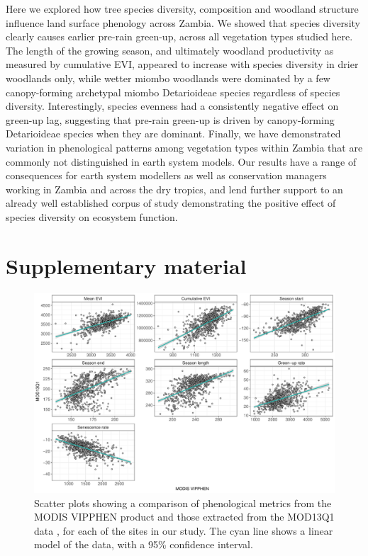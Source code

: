 \begin{refsection}
Here we explored how tree species diversity, composition and woodland structure influence land surface phenology across Zambia. We showed that species diversity clearly causes earlier pre-rain green-up, across all vegetation types studied here. The length of the growing season, and ultimately woodland productivity as measured by cumulative EVI, appeared to increase with species diversity in drier woodlands only, while wetter miombo woodlands were dominated by a few canopy-forming archetypal miombo Detarioideae species regardless of species diversity. Interestingly, species evenness had a consistently negative effect on green-up lag, suggesting that pre-rain green-up is driven by canopy-forming Detarioideae species when they are dominant. Finally, we have demonstrated variation in phenological patterns among vegetation types within Zambia that are commonly not distinguished in earth system models. Our results have a range of consequences for earth system modellers as well as conservation managers working in Zambia and across the dry tropics, and lend further support to an already well established corpus of study demonstrating the positive effect of species diversity on ecosystem function.

\newpage{}
\FloatBarrier{}
\begingroup
{}
\printbibliography[heading=subbibintoc]
\endgroup
\newpage{}

\section{Supplementary material}
\label{phen:sec:supp}
\begin{supplement} 

\begin{figure}[H]
	\includegraphics[width=\linewidth]{img/vipphen_compare}
	\caption[Scatter plots comparing MOD13Q1 and MODIS VIPPHEN phenological measurements]{Scatter plots showing a comparison of phenological metrics from the MODIS VIPPHEN product \citep{VIPPHEN} and those extracted from the MOD13Q1 data \citep{MOD13Q1}, for each of the sites in our study. The cyan line shows a linear model of the data, with a 95\% confidence interval.}
	\label{phen:vipphen_compare}
\end{figure}


\end{supplement}
\end{refsection}
